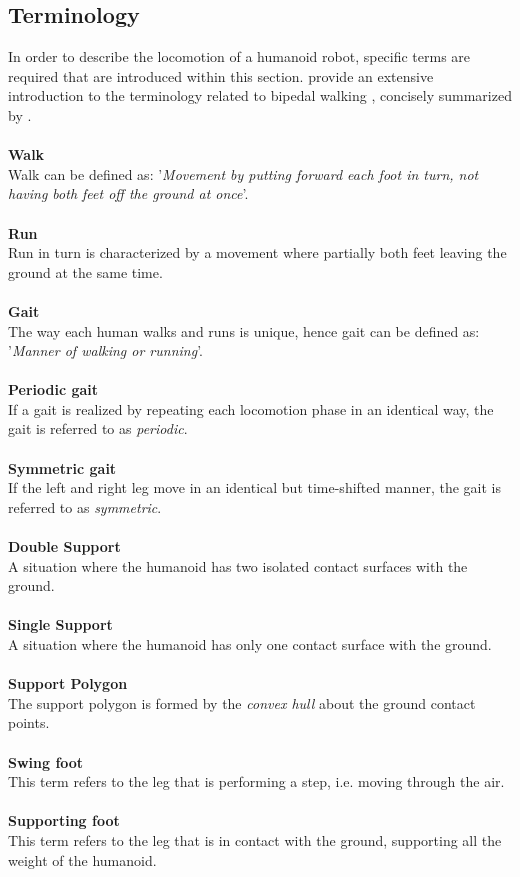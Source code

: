 \subsection{Terminology}
In order to describe the locomotion of a humanoid robot, specific terms are required that are introduced within this section. \citeauthor{vukobratovic2007towards} provide an extensive introduction to the terminology related to bipedal walking \cite{vukobratovic2007towards}, concisely summarized by \citeauthor{dekker2009zero} \cite{dekker2009zero}.\\\\
\textbf{Walk}\\
Walk can be defined as: '\textit{Movement by putting forward each foot in turn, not having both feet off the ground at once}'.\\\\
\textbf{Run}\\
Run in turn is characterized by  a movement where partially both feet leaving the ground at the same time.\\\\
\textbf{Gait}\\
The way each human walks and runs is unique, hence gait can be defined as: '\textit{Manner of walking or running}'.\\\\
\textbf{Periodic gait}\\
If a gait is realized by repeating each locomotion phase in an identical way, the gait is referred to as \textit{periodic}.\\\\
\textbf{Symmetric gait}\\
If the left and right leg move in an identical but time-shifted manner, the gait is referred to as \textit{symmetric}.\\\\
\textbf{Double Support}\\
A situation where the humanoid has two isolated contact surfaces with the ground.\\\\
\textbf{Single Support}\\
A situation where  the humanoid has only one contact surface with the ground.\\\\
\textbf{Support Polygon}\\%
The support polygon is formed by the \textit{convex hull} about the ground contact points.    \\\\
\textbf{Swing foot}\\
This term refers to the leg that is performing a step, i.e. moving through the air.\\\\
\textbf{Supporting foot}\\
This term refers to the leg that is in contact with the ground, supporting all the weight of the humanoid. 

